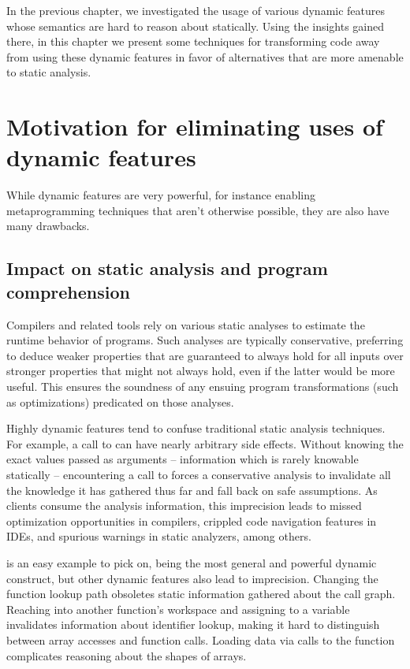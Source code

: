 In the previous chapter, we investigated the usage of various dynamic \matlab
features whose semantics are hard to reason about statically. Using the
insights gained there, in this chapter we present some techniques for
transforming code away from using these dynamic features in favor of
alternatives that are more amenable to static analysis.

\section{Motivation for eliminating uses of dynamic features}

While dynamic features are very powerful, for instance enabling metaprogramming
techniques that aren't otherwise possible, they are also have many drawbacks.

\subsection{Impact on static analysis and program comprehension}

Compilers and related tools rely on various static analyses to estimate the
runtime behavior of programs. Such analyses are typically conservative,
preferring to deduce weaker properties that are guaranteed to always hold for
all inputs over stronger properties that might not always hold, even if the
latter would be more useful. This ensures the soundness of any ensuing program
transformations (such as optimizations) predicated on those analyses.

Highly dynamic features tend to confuse traditional static analysis techniques.
For example, a call to  can have nearly arbitrary side effects.
Without knowing the exact values passed as arguments -- information which is
rarely knowable statically -- encountering a call to  forces a
conservative analysis to invalidate all the knowledge it has gathered thus far
and fall back on safe assumptions. As clients consume the analysis information,
this imprecision leads to missed optimization opportunities in compilers,
crippled code navigation features in IDEs, and spurious warnings in static
analyzers, among others.

 is an easy example to pick on, being the most general and powerful
dynamic construct, but other dynamic features also lead to imprecision.
Changing the function lookup path obsoletes static information gathered about
the call graph. Reaching into another function's workspace and assigning to a
variable invalidates information about identifier lookup, making it hard to
distinguish between array accesses and function calls. Loading data via calls
to the  function complicates reasoning about the shapes of arrays.

